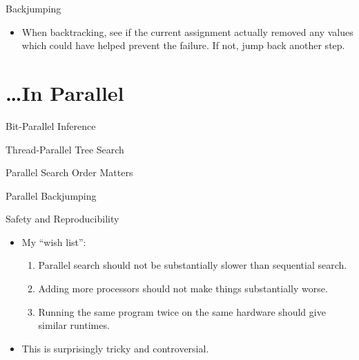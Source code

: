 \documentclass{beamer}
\begin{document}
\begin{frame}{Backjumping}

    \begin{itemize}
        \item When backtracking, see if the current assignment actually removed any values which
            could have helped prevent the failure. If not, jump back another step.
    \end{itemize}

\end{frame}

\section{\ldots{}In Parallel}

\begin{frame}{Bit-Parallel Inference}

\end{frame}

\begin{frame}{Thread-Parallel Tree Search}

\end{frame}

\begin{frame}{Parallel Search Order Matters}

\end{frame}

\begin{frame}{Parallel Backjumping}

\end{frame}

\begin{frame}{Safety and Reproducibility}

    \begin{itemize}
        \item My ``wish list'':
            \begin{enumerate}
                \item Parallel search should not be substantially slower than sequential search.
                \item Adding more processors should not make things substantially worse.
                \item Running the same program twice on the same hardware should give similar
                    runtimes.
            \end{enumerate}
        \item This is surprisingly tricky and controversial.
    \end{itemize}

\end{frame}
\end{document}
